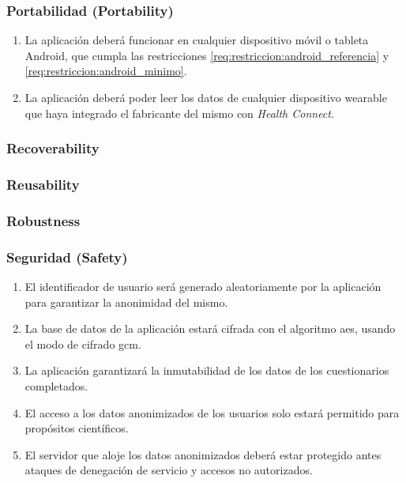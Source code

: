         \subsubsection{Portabilidad (Portability)}
            \begin{enumerate}[resume, label=\textbf{\texttt{RNF-\arabic*}}]
                \item La aplicación deberá funcionar en cualquier dispositivo móvil o tableta Android, que cumpla las restricciones \ref{req:restriccion:android_referencia} y \ref{req:restriccion:android_minimo}.
                \item La aplicación deberá poder leer los datos de cualquier dispositivo \gls{wearable} que haya integrado el fabricante del mismo con \textit{Health Connect}.
            \end{enumerate}
        \subsubsection{Recoverability}
        \subsubsection{Reusability}
        \subsubsection{Robustness}
        \subsubsection{Seguridad (Safety)}
            \begin{enumerate}[resume, label=\textbf{\texttt{RNF-\arabic*}}]
                \item El identificador de usuario será generado aleatoriamente por la aplicación para garantizar la anonimidad del mismo.  
                \item La base de datos de la aplicación estará cifrada con el algoritmo \gls{aes}, usando el modo de cifrado \gls{gcm}.
                \item La aplicación garantizará la inmutabilidad de los datos de los cuestionarios completados.
                \item El acceso a los datos anonimizados de los usuarios solo estará permitido para propósitos científicos.
                \item El servidor que aloje los datos anonimizados deberá estar protegido antes ataques de denegación de servicio y accesos no autorizados.
            \end{enumerate}
